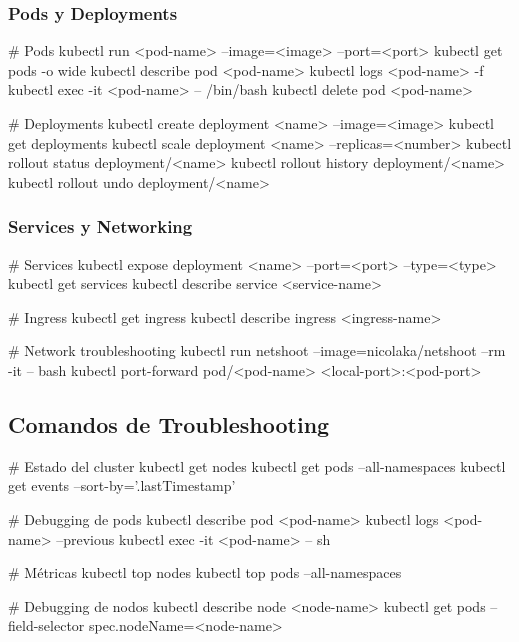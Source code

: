 \documentclass[11pt,a4paper]{article}
\begin{document}
\subsubsection{Pods y Deployments}

\begin{commandbox}
\# Pods
kubectl run <pod-name> --image=<image> --port=<port>
kubectl get pods -o wide
kubectl describe pod <pod-name>
kubectl logs <pod-name> -f
kubectl exec -it <pod-name> -- /bin/bash
kubectl delete pod <pod-name>

\# Deployments
kubectl create deployment <name> --image=<image>
kubectl get deployments
kubectl scale deployment <name> --replicas=<number>
kubectl rollout status deployment/<name>
kubectl rollout history deployment/<name>
kubectl rollout undo deployment/<name>
\end{commandbox}

\subsubsection{Services y Networking}

\begin{commandbox}
\# Services
kubectl expose deployment <name> --port=<port> --type=<type>
kubectl get services
kubectl describe service <service-name>

\# Ingress
kubectl get ingress
kubectl describe ingress <ingress-name>

\# Network troubleshooting
kubectl run netshoot --image=nicolaka/netshoot --rm -it -- bash
kubectl port-forward pod/<pod-name> <local-port>:<pod-port>
\end{commandbox}

\subsection{Comandos de Troubleshooting}

\begin{commandbox}
\# Estado del cluster
kubectl get nodes
kubectl get pods --all-namespaces
kubectl get events --sort-by='.lastTimestamp'

\# Debugging de pods
kubectl describe pod <pod-name>
kubectl logs <pod-name> --previous
kubectl exec -it <pod-name> -- sh

\# Métricas
kubectl top nodes
kubectl top pods --all-namespaces

\# Debugging de nodos
kubectl describe node <node-name>
kubectl get pods --field-selector spec.nodeName=<node-name>
\end{commandbox}
\end{document}
